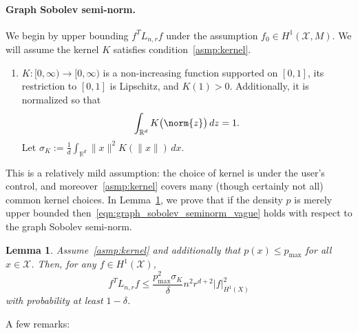 \documentclass{article}
\newcommand{\Reals}{\mathbb{R}}
\newcommand{\1}{\mathbf{1}}
\newcommand{\Rd}{\Reals^d}
\newcommand{\Lap}{L}
\newcommand{\Xset}{\mathcal{X}}
\theoremstyle{alden}
\theoremstyle{aldenthm}
\newtheorem{lemma}{Lemma}
\theoremstyle{definition}
\theoremstyle{remark}
\begin{document}
\paragraph{Graph Sobolev semi-norm.}
We begin by upper bounding $f^T \Lap_{n,r} f$ under the assumption $f_0 \in H^1(\Xset,M)$. We will assume the kernel $K$ satisfies condition~\ref{asmp:kernel}.
\begin{enumerate}[label=(K\arabic*)]
	\item
	\label{asmp:kernel}
	$K:[0,\infty) \to [0,\infty)$ is a non-increasing function supported on $[0,1]$, its restriction to $[0,1]$ is Lipschitz, and $K(1) > 0$. Additionally, it is normalized so that
	\begin{equation*}
	\int_{\Reals^d} K\bigl(\norm{z}\bigr) \,dz = 1.
	\end{equation*}
	Let $\sigma_K := \frac{1}{d} \int_{\Rd} \|x\|^2 K(\|x\|) \,dx$.
\end{enumerate}
This is a relatively mild assumption: the choice of kernel is under the user's control, and moreover~\ref{asmp:kernel} covers many (though certainly not all) common kernel choices. In Lemma~\ref{lem:graph_sobolev_seminorm}, we prove that if the density $p$ is merely upper bounded then~\eqref{eqn:graph_sobolev_seminorm_vague} holds with respect to the graph Sobolev semi-norm.
\begin{lemma}
	\label{lem:graph_sobolev_seminorm}
	Assume~\ref{asmp:kernel} and additionally that $p(x) \leq p_{\max}$ for all $x \in \Xset$. Then, for any $f \in H^1(\Xset)$, 
	\begin{equation}
	\label{eqn:graph_sobolev_seminorm}
	f^T \Lap_{n,r} f \leq \frac{p_{\max}^2 \sigma_K}{\delta} n^2 r^{d + 2} |f|_{H^1(X)}^2
	\end{equation}
	with probability at least $1 - \delta$.
\end{lemma}
A few remarks:
\end{document}
